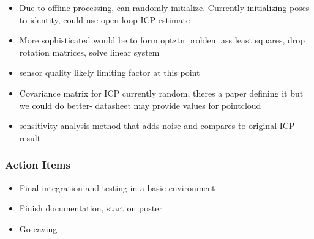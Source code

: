 \begin{itemize}
				\item Due to offline processing, can randomly initialize. Currently initializing poses to identity, could use open loop ICP estimate
				\item More sophisticated would be to form optztn problem ass least squares, drop rotation matrices, solve linear system
				\item sensor quality likely limiting factor at this point
				\item Covariance matrix for ICP currently random, theres a paper defining it but we could do better- datasheet may provide values for pointcloud
				\item sensitivity analysis method that adds noise and compares to original ICP result 
			\end{itemize}

		\subsubsection*{Action Items}
			\begin{itemize}
				\item Final integration and testing in a basic environment
				\item Finish documentation, start on poster
				\item Go caving
			\end{itemize}

